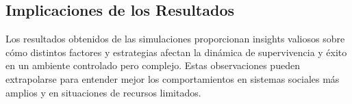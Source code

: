 \documentclass[11pt]{article}
\begin{document}


\subsection{Implicaciones de los Resultados}
Los resultados obtenidos de las simulaciones proporcionan insights valiosos sobre cómo distintos factores y estrategias afectan la dinámica de supervivencia y éxito en un ambiente controlado pero complejo. Estas observaciones pueden extrapolarse para entender mejor los comportamientos en sistemas sociales más amplios y en situaciones de recursos limitados.
\end{document}
